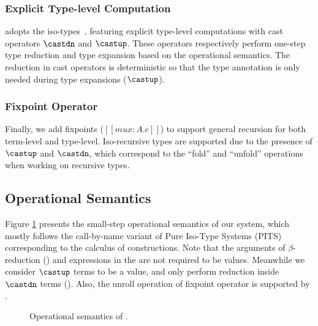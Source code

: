 \subsubsection{Explicit Type-level Computation}
\label{sec:cast}
\System adopts the iso-types~\cite{yang2016unified}, featuring explicit type-level
computations with cast operators $\castdn$ and $\castup$. These operators
respectively perform one-step
type reduction and type expansion based on the operational semantics.
The reduction in cast operators is deterministic so that the type annotation is
only needed during type expansions ($\castup$).

\subsubsection{Fixpoint Operator}

Finally, we add fixpoints ($[[mu x : A. e]]$)
to support general recursion for both term-level
and type-level. Iso-recursive types are supported due to the presence of $\castup$
and $\castdn$, which correspond to the ``fold'' and ``unfold'' operations when
working on recursive types.

\subsection{Operational Semantics}

Figure \ref{fig:semantics} presents the small-step operational semantics of our system,
which mostly follows the call-by-name variant of Pure Iso-Type Systems (PITS)
\cite{yang2019pure} corresponding to the calculus of constructions.
Note that the arguments of $\beta$-reduction () and expressions in
the  are not required to be values.
Meanwhile we consider $\castup$ terms to be a value,
and only perform reduction inside $\castdn$ terms (). Also, the unroll
operation of fixpoint operator is supported by .

\begin{figure}[t]
    \centering


    \caption{Operational semantics of \name.}
    \label{fig:semantics}
\end{figure}

